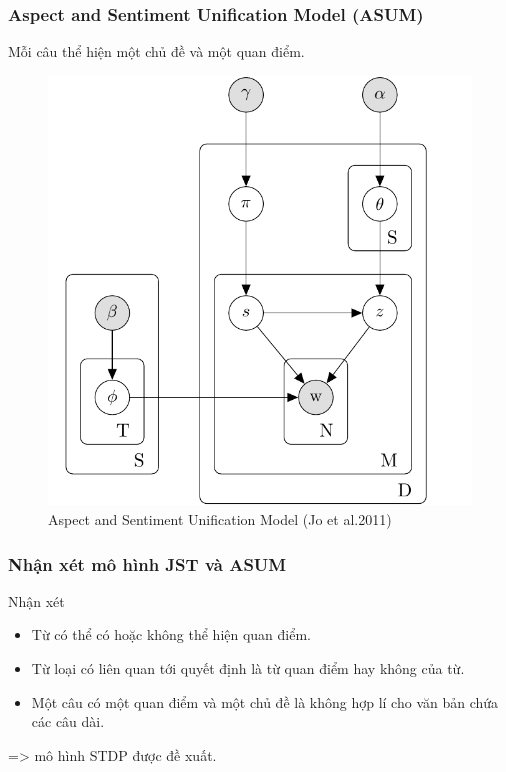 \documentclass{beamer}
\begin{document}
\begin{frame}
\frametitle{Aspect and Sentiment Unification Model (ASUM) }
Mỗi câu thể hiện một chủ đề và một quan điểm.
\begin{center}
\begin{figure}
\includegraphics[scale=0.2]{Image/ASUM.png}
\caption*{Aspect and Sentiment Unification Model (Jo et al.2011)}
\label{labels:1}
\end{figure}
\end{center}
\end{frame}

\begin{frame}
\frametitle{Nhận xét mô hình JST và ASUM}
\begin{block}{Nhận xét}
\begin{itemize}
\item Từ có thể có hoặc không thể hiện quan điểm.
\item Từ loại có liên quan tới quyết định là từ quan điểm hay không của từ.
\item Một câu có một quan điểm và một chủ đề là không hợp lí cho văn bản chứa các câu dài.
\end{itemize}
\end{block}
=> mô hình STDP được đề xuất.
\end{frame}
\end{document}
